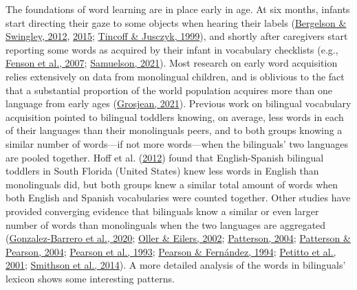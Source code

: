 \documentclass[
]{article}
\begin{document}
The foundations of word learning are in place early in age. At six
months, infants start directing their gaze to some objects when hearing
their labels (\protect\hyperlink{ref-bergelson2012months}{Bergelson \&
Swingley, 2012}, \protect\hyperlink{ref-bergelson2015early}{2015};
\protect\hyperlink{ref-tincoff1999beginnings}{Tincoff \& Jusczyk,
1999}), and shortly after caregivers start reporting some words as
acquired by their infant in vocabulary checklists (e.g.,
\protect\hyperlink{ref-fenson2007macarthurbates}{Fenson et al., 2007};
\protect\hyperlink{ref-samuelson2021precision}{Samuelson, 2021}). Most
research on early word acquisition relies extensively on data from
monolingual children, and is oblivious to the fact that a substantial
proportion of the world population acquires more than one language from
early ages (\protect\hyperlink{ref-grosjean2021extent}{Grosjean, 2021}).
Previous work on bilingual vocabulary acquisition pointed to bilingual
toddlers knowing, on average, less words in each of their languages than
their monolinguals peers, and to both groups knowing a similar number of
words---if not more words---when the bilinguals' two languages are
pooled together. Hoff et al.
(\protect\hyperlink{ref-hoff2012dual}{2012}) found that English-Spanish
bilingual toddlers in South Florida (United States) knew less words in
English than monolinguals did, but both groups knew a similar total
amount of words when both English and Spanish vocabularies were counted
together. Other studies have provided converging evidence that
bilinguals know a similar or even larger number of words than
monolinguals when the two languages are aggregated
(\protect\hyperlink{ref-gonzalez-barrero2020bilingual}{Gonzalez-Barrero
et al., 2020}; \protect\hyperlink{ref-oller2002language}{Oller \&
Eilers, 2002}; \protect\hyperlink{ref-patterson2004comparing}{Patterson,
2004}; \protect\hyperlink{ref-patterson2004bilingual}{Patterson \&
Pearson, 2004}; \protect\hyperlink{ref-pearson1993lexical}{Pearson et
al., 1993}; \protect\hyperlink{ref-pearson1994patterns}{Pearson \&
Fernández, 1994}; \protect\hyperlink{ref-petitto2001bilingual}{Petitto
et al., 2001}; \protect\hyperlink{ref-smithson2014bilingualism}{Smithson
et al., 2014}). A more detailed analysis of the words in bilinguals'
lexicon shows some interesting patterns.
\end{document}
